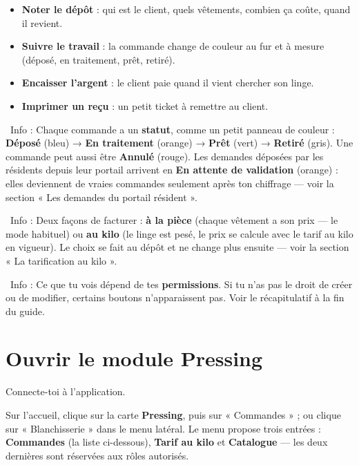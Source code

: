 \documentclass[12pt,a4paper]{article}
\newcommand{\info}[1]{\par\noindent\textcolor{lagoon}{\faInfoCircle\ Info : #1}\par}
\begin{document}
\begin{itemize}[label=\textcolor{lagoon}{\faFile}]
  \item \textbf{Noter le dépôt} : qui est le client, quels vêtements, combien ça coûte, quand il revient.
  \item \textbf{Suivre le travail} : la commande change de couleur au fur et à mesure (déposé, en traitement, prêt, retiré).
  \item \textbf{Encaisser l'argent} : le client paie quand il vient chercher son linge.
  \item \textbf{Imprimer un reçu} : un petit ticket à remettre au client.
\end{itemize}

\info{Chaque commande a un \textbf{statut}, comme un petit panneau de couleur : \textbf{Déposé} (bleu) → \textbf{En traitement} (orange) → \textbf{Prêt} (vert) → \textbf{Retiré} (gris). Une commande peut aussi être \textbf{Annulé} (rouge). Les demandes déposées par les résidents depuis leur portail arrivent en \textbf{En attente de validation} (orange) : elles deviennent de vraies commandes seulement après ton chiffrage — voir la section « Les demandes du portail résident ».}

\info{Deux façons de facturer : \textbf{à la pièce} (chaque vêtement a son prix — le mode habituel) ou \textbf{au kilo} (le linge est pesé, le prix se calcule avec le tarif au kilo en vigueur). Le choix se fait au dépôt et ne change plus ensuite — voir la section « La tarification au kilo ».}

\info{Ce que tu vois dépend de tes \textbf{permissions}. Si tu n'as pas le droit de créer ou de modifier, certains boutons n'apparaissent pas. Voir le récapitulatif à la fin du guide.}

\newpage

\section{Ouvrir le module Pressing}\label{sec:ouvrir}

\begin{etapes}
  \item Connecte-toi à l'application.
  \item Sur l'accueil, clique sur la carte \textbf{Pressing}, puis sur « Commandes » ; ou clique sur « Blanchisserie » dans le menu latéral. Le menu propose trois entrées : \textbf{Commandes} (la liste ci-dessous), \textbf{Tarif au kilo} et \textbf{Catalogue} — les deux dernières sont réservées aux rôles autorisés.
\end{etapes}
\end{document}
